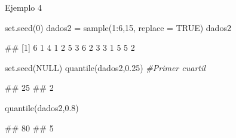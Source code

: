 \documentclass[
  ignorenonframetext,
  aspectratio=169]{beamer}
\newenvironment{Shaded}{\begin{snugshade}}{\end{snugshade}}
\newcommand{\AttributeTok}[1]{\textcolor[rgb]{0.77,0.63,0.00}{#1}}
\newcommand{\CommentTok}[1]{\textcolor[rgb]{0.56,0.35,0.01}{\textit{#1}}}
\newcommand{\ConstantTok}[1]{\textcolor[rgb]{0.00,0.00,0.00}{#1}}
\newcommand{\DecValTok}[1]{\textcolor[rgb]{0.00,0.00,0.81}{#1}}
\newcommand{\FloatTok}[1]{\textcolor[rgb]{0.00,0.00,0.81}{#1}}
\newcommand{\FunctionTok}[1]{\textcolor[rgb]{0.00,0.00,0.00}{#1}}
\newcommand{\NormalTok}[1]{#1}
\newcommand{\OtherTok}[1]{\textcolor[rgb]{0.56,0.35,0.01}{#1}}
\newcommand{\SpecialCharTok}[1]{\textcolor[rgb]{0.00,0.00,0.00}{#1}}
\let\oldverbatim\verbatim
\let\endoldverbatim\endverbatim
\renewenvironment{verbatim}{\tiny\oldverbatim}{\endoldverbatim}
\begin{document}
\begin{frame}[fragile]{Ejemplo 4}
\protect\hypertarget{ejemplo-4-8}{}
\begin{Shaded}
\begin{Highlighting}[]
\FunctionTok{set.seed}\NormalTok{(}\DecValTok{0}\NormalTok{)}
\NormalTok{dados2 }\OtherTok{=} \FunctionTok{sample}\NormalTok{(}\DecValTok{1}\SpecialCharTok{:}\DecValTok{6}\NormalTok{,}\DecValTok{15}\NormalTok{, }\AttributeTok{replace =} \ConstantTok{TRUE}\NormalTok{)}
\NormalTok{dados2}
\end{Highlighting}
\end{Shaded}

\begin{verbatim}
##  [1] 6 1 4 1 2 5 3 6 2 3 3 1 5 5 2
\end{verbatim}

\begin{Shaded}
\begin{Highlighting}[]
\FunctionTok{set.seed}\NormalTok{(}\ConstantTok{NULL}\NormalTok{)}
\FunctionTok{quantile}\NormalTok{(dados2,}\FloatTok{0.25}\NormalTok{) }\CommentTok{\#Primer cuartil}
\end{Highlighting}
\end{Shaded}

\begin{verbatim}
## 25% 
##   2
\end{verbatim}

\begin{Shaded}
\begin{Highlighting}[]
\FunctionTok{quantile}\NormalTok{(dados2,}\FloatTok{0.8}\NormalTok{)}
\end{Highlighting}
\end{Shaded}

\begin{verbatim}
## 80% 
##   5
\end{verbatim}
\end{frame}
\end{document}
